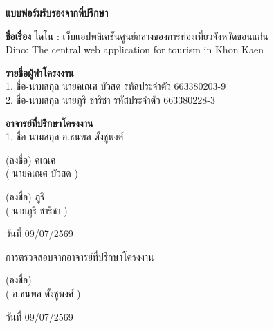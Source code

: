 \begin{center}
\textbf{แบบฟอร์มรับรองจากที่ปรึกษา}
\end{center}

\vspace{0.5cm}
\noindent\textbf{ชื่อเรื่อง} ไดโน : เว็บแอปพลิเคชันศูนย์กลางของการท่องเที่ยวจังหวัดขอนแก่น\\
\hspace*{2cm} Dino: The central web application for tourism in Khon Kaen

\vspace{0.5cm}
\noindent\textbf{รายชื่อผู้ทําโครงงาน}\\
1. ชื่อ-นามสกุล นายคเณศ บัวสด รหัสประจำตัว 663380203-9\\
2. ชื่อ-นามสกุล นายภูริ     ชาริชา รหัสประจำตัว 663380228-3

\vspace{0.5cm}
\noindent\textbf{อาจารย์ที่ปรึกษาโครงงาน}\\
1. ชื่อ-นามสกุล อ.ธนพล ตั้งชูพงศ์

\vspace{1.5cm}
\hspace*{3cm}(ลงชื่อ) \dotfill คเณศ \dotfill \\
\hspace*{5cm}( นายคเณศ บัวสด )

\vspace{0.8cm}
\hspace*{3cm}(ลงชื่อ) \dotfill ภูริ \dotfill \\
\hspace*{5cm}( นายภูริ ชาริชา )

\hspace*{9cm}วันที่ 09/07/2569

\vspace{1.5cm}
\noindent การตรวจสอบจากอาจารย์ที่ปรึกษาโครงงาน

\vspace{0.3cm}
\noindent\hrulefill

\noindent\hrulefill

\vspace{1cm}
\hspace*{3cm}(ลงชื่อ) \dotfill \\
\hspace*{5cm}( อ.ธนพล ตั้งชูพงศ์ )

\hspace*{9cm}วันที่ 09/07/2569
